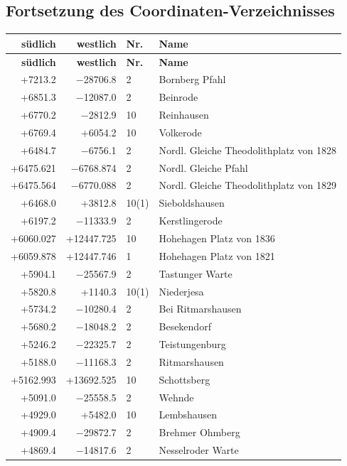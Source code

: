 \documentclass[12pt,a4paper]{article}
\begin{document}
\normalsize

\newpage
\subsection*{Fortsetzung des Coordinaten-Verzeichnisses}

\small

\begin{longtable}{r r l p{6cm}}
\toprule
\textbf{s\"udlich} & \textbf{westlich} & \textbf{Nr.} & \textbf{Name} \\
\midrule
\endfirsthead
\toprule
\textbf{s\"udlich} & \textbf{westlich} & \textbf{Nr.} & \textbf{Name} \\
\midrule
\endhead
\bottomrule
\endfoot
+7213.2 & $-$28706.8 & 2 & Bornberg Pfahl \\
+6851.3 & $-$12087.0 & 2 & Beinrode \\
+6770.2 & $-$2812.9 & 10 & Reinhausen \\
+6769.4 & +6054.2 & 10 & Volkerode \\
+6484.7 & $-$6756.1 & 2 & Nordl. Gleiche Theodolithplatz von 1828 \\
+6475.621 & $-$6768.874 & 2 & Nordl. Gleiche Pfahl \\
+6475.564 & $-$6770.088 & 2 & Nordl. Gleiche Theodolithplatz von 1829 \\
+6468.0 & +3812.8 & 10(1) & Sieboldshausen \\
+6197.2 & $-$11333.9 & 2 & Kerstlingerode \\
+6060.027 & +12447.725 & 10 & Hohehagen Platz von 1836 \\
+6059.878 & +12447.746 & 1 & Hohehagen Platz von 1821 \\
+5904.1 & $-$25567.9 & 2 & Tastunger Warte \\
+5820.8 & +1140.3 & 10(1) & Niederjesa \\
+5734.2 & $-$10280.4 & 2 & Bei Ritmarshausen \\
+5680.2 & $-$18048.2 & 2 & Besekendorf \\
+5246.2 & $-$22325.7 & 2 & Teistungenburg \\
+5188.0 & $-$11168.3 & 2 & Ritmarshausen \\
+5162.993 & +13692.525 & 10 & Schottsberg \\
+5091.0 & $-$25558.5 & 2 & Wehnde \\
+4929.0 & +5482.0 & 10 & Lembshausen \\
+4909.4 & $-$29872.7 & 2 & Brehmer Ohmberg \\
+4869.4 & $-$14817.6 & 2 & Nesselroder Warte \\

\end{longtable}
\end{document}
